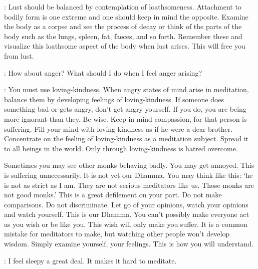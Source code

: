 : Lust should be balanced by contemplation of loathsomeness. Attachment to bodily form is one extreme and one should keep in mind the opposite. Examine the body as a corpse and see the process of decay or think of the parts of the body such as the lungs, spleen, fat, faeces, and so forth. Remember these and visualize this loathsome aspect of the body when lust arises. This will free you from lust.

:
How about anger? What should I do when I feel anger arising?


: You must use loving-kindness. When angry states of mind arise in meditation, balance them by developing feelings of loving-kindness. If someone does something bad or gets angry, don't get angry yourself. If you do, you are being more ignorant than they. Be wise. Keep in mind compassion, for that person is suffering. Fill your mind with loving-kindness as if he were a dear brother. Concentrate on the feeling of loving-kindness as a meditation subject. Spread it to all beings in the world. Only through loving-kindness is hatred overcome.

Sometimes you may see other monks behaving badly. You may get annoyed. This is suffering unnecessarily. It is not yet our Dhamma. You may think like this: `he is not as strict as I am. They are not serious meditators like us. Those monks are not good monks.' This is a great defilement on your part. Do not make comparisons. Do not discriminate. Let go of your opinions, watch your opinions and watch yourself. This is our Dhamma. You can't possibly make everyone act as you wish or be like you. This wish will only make you suffer. It is a common mistake for meditators to make, but watching other people won't develop wisdom. Simply examine yourself, your feelings. This is how you will understand.

:
I feel sleepy a great deal. It makes it hard to meditate.

